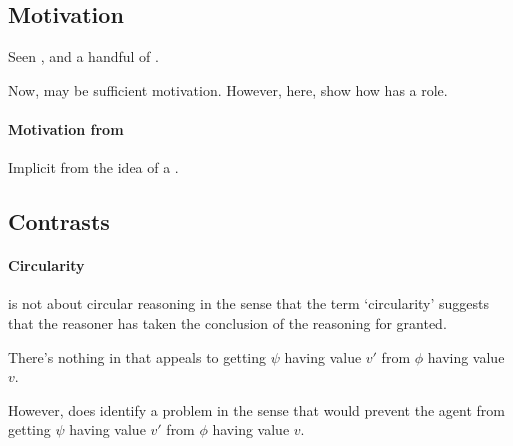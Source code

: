 \subsection{Motivation}
\label{sec:motivation-1}

\begin{note}
  Seen \ideaCS{}, and a handful of .

  Now,  may be sufficient motivation.
  However, here, show how \ideaS{} has a role.
\end{note}

\paragraph{Motivation from \ideaS{}}

\begin{note}
  Implicit from the idea of a \sink{}.
\end{note}

\subsection{Contrasts}
\label{sec:contrasts}

\paragraph{Circularity}

\begin{note}
  \ideaCS{} is not about circular reasoning in the sense that the term `circularity' suggests that the reasoner has taken the conclusion of the reasoning for granted.

  There's nothing in \ideaCS{} that appeals to getting \(\psi\) having value \(v'\) from \(\phi\) having value \(v\).

  However, does identify a problem in the sense that would prevent the agent from getting \(\psi\) having value \(v'\) from \(\phi\) having value \(v\).
\end{note}

